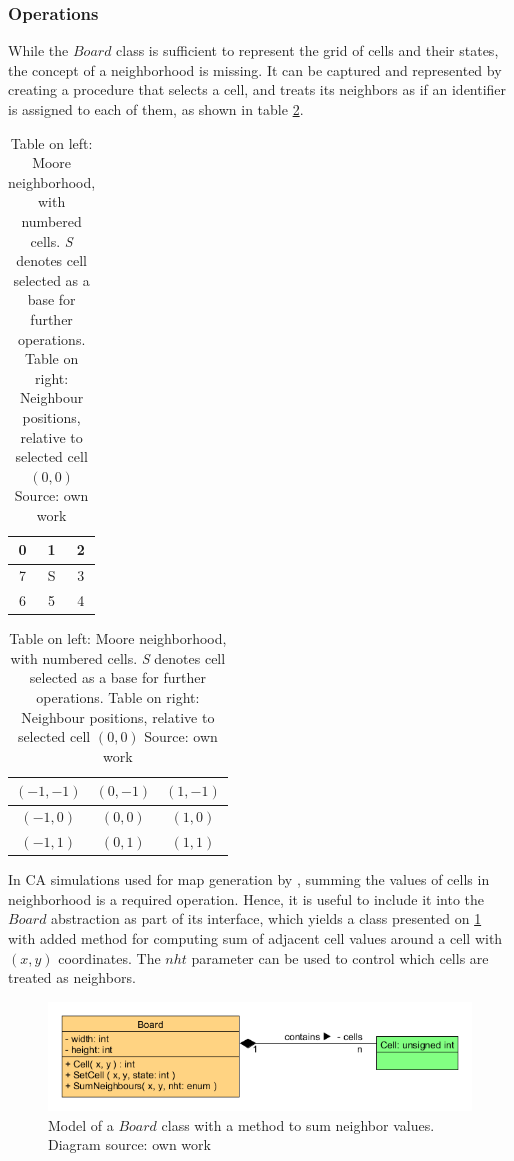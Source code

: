 \documentclass[12pt]{report}
\begin{document}
\subsubsection{Operations}
While the $Board$ class is sufficient to represent the grid of cells and their states, the concept of a neighborhood is missing. It can be captured and represented by creating a procedure that selects a cell, and treats its neighbors as if an identifier is assigned to each of them, as shown in table \cref{tab:cellneighbors}. 

\begin{table}[h] 
	\centering 
	\begin{tabular}{| c | c | c |}\hline 
		0 & 1 & 2 \\ \hline
		7 & S & 3 \\ \hline
		6 & 5 & 4 \\ \hline
	\end{tabular} 
	\begin{tabular}{| c | c | c |}\hline 
		$(-1,-1)$ & $( 0,-1)$ & $( 1,-1)$ \\ \hline
		$(-1, 0)$ & $( 0, 0)$ & $( 1, 0)$ \\ \hline
		$(-1, 1)$ & $( 0, 1)$ & $( 1, 1)$ \\ \hline
	\end{tabular} 
	\caption{Table on left: Moore neighborhood, with numbered cells. \textit{S} denotes cell selected as a base for further operations. Table on right: Neighbour positions, relative to selected cell $(0,0)$ Source: own work}
	\label{tab:cellneighbors}
\end{table}

In CA simulations used for map generation by \autocite{johnson2010cellular}, summing the values of cells in neighborhood is a required operation. Hence, it is useful to include it into the $Board$ abstraction as part of its interface, which yields a class presented on \cref{fig:boardcell2} with added method for computing sum of adjacent cell values around a cell with $(x,y)$ coordinates. The $nht$ parameter can be used to control which cells are treated as neighbors.

\begin{figure}[H]
	\centering
	\includegraphics[width=0.8\linewidth]{diagrams/boardcell02}
	\caption{Model of a $Board$ class with a method to sum neighbor values. Diagram source: own work} 
	\label{fig:boardcell2}
\end{figure} 
\end{document}
